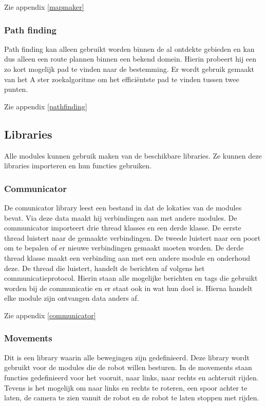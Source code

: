 \documentclass[a4paper,10pt]{article}
\begin{document}
Zie appendix \ref{mapmaker}

\subsubsection{Path finding}
Path finding kan alleen gebruikt worden binnen de al ontdekte gebieden en kan dus alleen een route plannen binnen een bekend domein. Hierin probeert hij een zo kort mogelijk pad te vinden naar de bestemming. Er wordt gebruik gemaakt van het A ster zoekalgoritme om het effici\"{e}ntste pad te vinden tussen twee punten.

Zie appendix \ref{pathfinding}

\subsection{Libraries}
Alle modules kunnen gebruik maken van de beschikbare libraries. Ze kunnen deze libraries importeren en hun functies gebruiken.

\subsubsection{Communicator}
De comunicator library leest een bestand in dat de lokaties van de modules bevat. Via deze data maakt hij verbindingen aan met andere modules. De communicator importeert drie thread klasses en een derde klasse. De eerste thread luistert naar de gemaakte verbindingen. De tweede luistert naar een poort om te bepalen of er nieuwe verbindingen gemaakt moeten worden. De derde thread klasse maakt een verbinding aan met een andere module en onderhoud deze. De thread die luistert, handelt de berichten af volgens het communicatieprotocol. Hierin staan alle mogelijke berichten en tags die gebruikt worden bij de communicatie en er staat ook in wat hun doel is. Hierna handelt elke module zijn ontvangen data anders af.

Zie appendix \ref{communicator}

\subsubsection{Movements}
Dit is een library waarin alle bewegingen zijn gedefinieerd. Deze library wordt gebruikt voor de modules die de robot willen besturen. In de movements staan functies gedefinieerd voor het vooruit, naar links, naar rechts en achteruit rijden. Tevens is het mogelijk om naar links en rechts te roteren, een spoor achter te laten, de camera te zien vanuit de robot en de robot te laten stoppen met rijden.%
\end{document}
